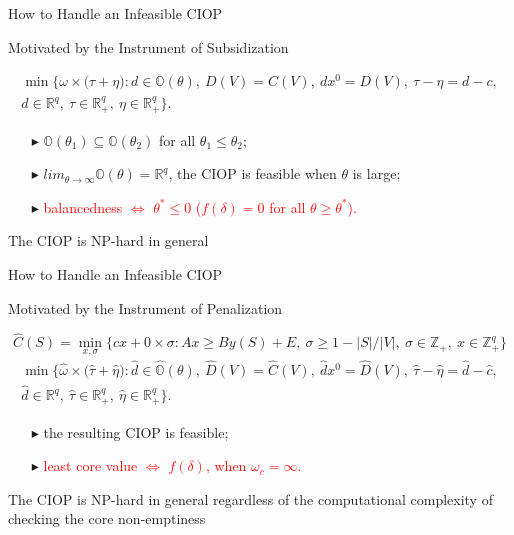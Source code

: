 \documentclass[14pt]{beamer}
\newcommand{\R}{\mathbb{R}}
\newcommand{\Z}{\mathbb{Z}}
\begin{document}
\begin{frame}{How to Handle an Infeasible CIOP}
\vspace{-3mm}
\begin{shaded}
\centering
Motivated by the Instrument of Subsidization
\end{shaded}
\vspace{-5mm}
\footnotesize
\begin{eqnarray*}
\min \bigg\{ \omega \times \big( \tau + \eta \big): d \in \mathbb{O}(\theta), ~D(V) = C(V), ~dx^0 = D(V),~\tau -\eta = d-c,\\
d \in \R^{q},~\tau \in \R^{q}_+, ~\eta \in \R^{q}_+\bigg\}.
\end{eqnarray*}
\begin{itemize}
\small
\item[$\blacktriangleright$] $\mathbb{O}(\theta_1) \subseteq \mathbb{O}(\theta_2)$ for all $\theta_1 \leq \theta_2$;
\item[$\blacktriangleright$] $lim_{\theta \to\infty} \mathbb{O}(\theta) = \mathbb{R}^q$, the CIOP is feasible when $\theta$ is large;
\item[$\blacktriangleright$] \textcolor{red}{balancedness $\iff$ $\theta^* \leq 0$ ($f(\delta)=0$ for all $\theta \geq \theta^*$).}
\end{itemize}
\small
\centering
The CIOP is NP-hard in general
\end{frame}

\begin{frame}{How to Handle an Infeasible CIOP}
\vspace{-8mm}
\begin{shaded}
\centering
Motivated by the Instrument of Penalization
\end{shaded}
\vspace{-10mm}
\footnotesize
$$
\hat{C}(S) = \min_{x,\sigma} \bigg\{ cx + 0 \times \sigma:Ax \geq By(S) + E, ~\sigma \geq 1 - |S|/|V|, ~\sigma \in \Z_{+},~x \in \Z_{+}^{q} \bigg\}
$$
\vspace{-5mm}
\begin{eqnarray*}
\min \bigg\{ \hat{\omega} \times \big( \hat{\tau} + \hat{\eta} \big): \hat{d} \in \hat{\mathbb{O}}(\theta), ~\hat{D}(V) = \hat{C}(V), ~\hat{d}x^0 = \hat{D}(V),~\hat{\tau} -\hat{\eta} = \hat{d}-\hat{c},\\
\hat{d} \in \R^{q},~\hat{\tau} \in \R^{q}_+, ~\hat{\eta} \in \R^{q}_+\bigg\}.
\end{eqnarray*}
\vspace{-5mm}
\begin{itemize}
\small
\item[$\blacktriangleright$] the resulting CIOP is feasible;
\item[$\blacktriangleright$] \textcolor{red}{least core value $\iff$ $f(\delta)$, when $\omega_c = \infty$.} 
\end{itemize}
\vspace{2mm}
\small
\centering
The CIOP is NP-hard in general regardless of the computational complexity of checking the core non-emptiness
\end{frame}
\end{document}
